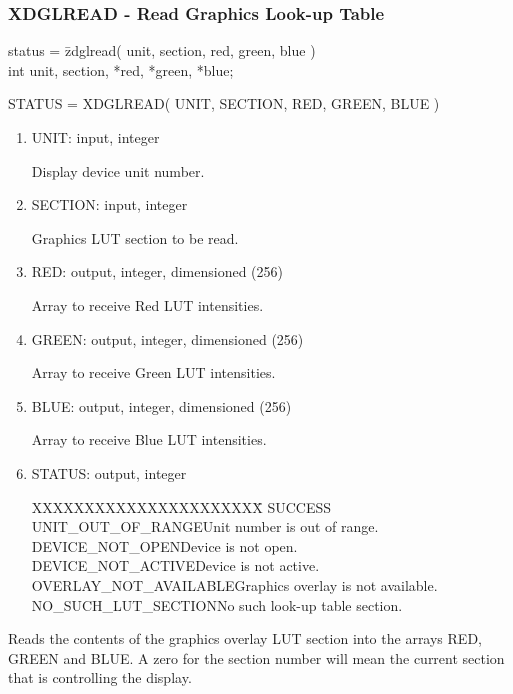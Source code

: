 \subsubsection{XDGLREAD - Read Graphics Look-up Table}
\begin{tabbing}
status = \=zdglread( unit, section, red, green, blue )\\
\>int  unit, section, *red, *green, *blue;\\
\end{tabbing}
STATUS = XDGLREAD( UNIT, SECTION, RED, GREEN, BLUE )
\begin{enumerate}
\item UNIT:  input, integer

Display device unit number.
\item SECTION:  input, integer

Graphics LUT section to be read.
\item RED:  output, integer, dimensioned (256)

Array to receive Red LUT intensities.
\item GREEN:  output, integer, dimensioned (256)

Array to receive Green LUT intensities.
\item BLUE:  output, integer, dimensioned (256)

Array to receive Blue LUT intensities.
\item STATUS:  output, integer
\begin{tabbing}
XXXXXXXXXXXXXXXXXXXXXX\=\kill
SUCCESS\\
UNIT\_OUT\_OF\_RANGE\>Unit number is out of range.\\
DEVICE\_NOT\_OPEN\>Device is not open.\\
DEVICE\_NOT\_ACTIVE\>Device is not active.\\
OVERLAY\_NOT\_AVAILABLE\>Graphics overlay is not available.\\
NO\_SUCH\_LUT\_SECTION\>No such look-up table section.\\
\end{tabbing}
\end{enumerate}
Reads the contents of the graphics overlay LUT section into the
arrays RED, GREEN and BLUE.  A zero for the section number will
mean the current section that is controlling the display.
\newpage
